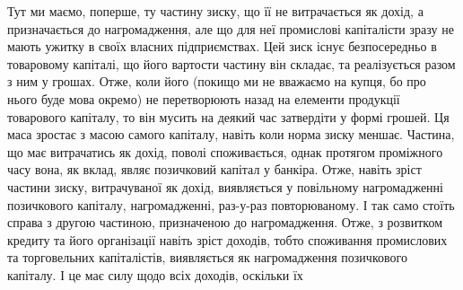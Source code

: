 Тут ми маємо, поперше, ту частину зиску, що її не витрачається як дохід,
а призначається до нагромадження, але що для неї промислові капіталісти
зразу не мають ужитку в своїх власних підприємствах. Цей зиск існує
безпосередньо в товаровому капіталі, що його вартости частину він складає, та
реалізується разом з ним у грошах. Отже, коли його (покищо ми не вважаємо
на купця, бо про нього буде мова окремо) не перетворюють назад на елементи
продукції товарового капіталу, то він мусить на деякий час затвердіти у формі
грошей. Ця маса зростає з масою самого капіталу, навіть коли норма зиску
меншає. Частина, що має витрачатись як дохід, поволі споживається, однак
протягом проміжного часу вона, як вклад, являє позичковий капітал у банкіра.
Отже, навіть зріст частини зиску, витрачуваної як дохід, виявляється у повільному
нагромадженні позичкового капіталу, нагромадженні, раз-у-раз повторюваному.
І так само стоїть справа з другою частиною, призначеною до нагромадження.
Отже, з розвитком кредиту та його організації навіть зріст доходів,
тобто споживання промислових та торговельних капіталістів, виявляється як нагромадження
позичкового капіталу. І це має силу щодо всіх доходів, оскільки їх
\parbreak{}  %
